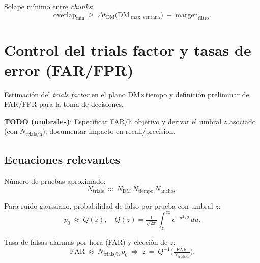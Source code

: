 Solape mínimo entre \textit{chunks}:
\begin{equation}\label{eq:overlap_min}
\mathrm{overlap}_{\min}\ \ge\ \Delta t_{\mathrm{DM}}\big(\mathrm{DM}_{\max\ \mathrm{ventana}}\big)\ +\ \mathrm{margen}_{\mathrm{filtro}}.
\end{equation}

\section{Control del trials factor y tasas de error (FAR/FPR)}
Estimación del \textit{trials factor} en el plano DM\(\times\)tiempo y definición preliminar de FAR/FPR para la toma de decisiones.

\textbf{TODO (umbrales)}: Especificar FAR/h objetivo y derivar el umbral \(z\) asociado (con \(N_{\mathrm{trials/h}}\)); documentar impacto en recall/precision.

\subsection*{Ecuaciones relevantes}
Número de pruebas aproximado:
\begin{equation}\label{eq:ntrials}
N_{\mathrm{trials}}\ \approx\ N_{\mathrm{DM}}\,N_{\mathrm{tiempo}}\,N_{\mathrm{anchos}}.
\end{equation}

Para ruido gaussiano, probabilidad de falso por prueba con umbral \(z\):
\begin{equation}\label{eq:qfunc}
p_0\ \approx\ Q(z),\quad Q(z)=\tfrac{1}{\sqrt{2\pi}}\int_{z}^{\infty}\!e^{-u^2/2}\,du.
\end{equation}

Tasa de falsas alarmas por hora (FAR) y elección de \(z\):
\begin{equation}\label{eq:far}
\mathrm{FAR}\ \approx\ N_{\mathrm{trials/h}}\,p_0\ \Rightarrow\ z\ =\ Q^{-1}\!\Big(\tfrac{\mathrm{FAR}}{N_{\mathrm{trials/h}}}\Big).
\end{equation}

